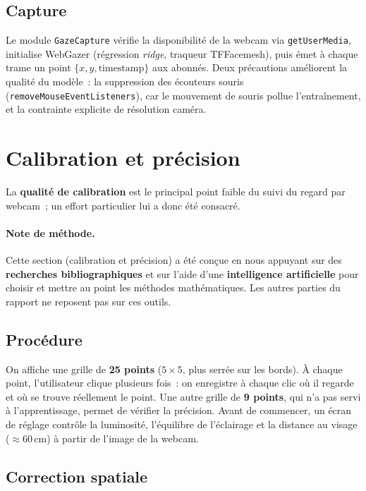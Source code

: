 \documentclass[11pt,a4paper]{article}
\newcommand{\code}[1]{\texttt{\small #1}}
\begin{document}
\subsection{Capture}

Le module \code{GazeCapture} vérifie la disponibilité de la webcam via
\code{getUserMedia}, initialise WebGazer (régression \emph{ridge}, traqueur
TFFacemesh), puis émet à chaque trame un point $\{x, y, \text{timestamp}\}$ aux
abonnés. Deux précautions améliorent la qualité du modèle~: la suppression des
écouteurs souris (\code{removeMouseEventListeners}), car le mouvement de souris
pollue l'entraînement, et la contrainte explicite de résolution caméra.

\section{Calibration et précision}

La \textbf{qualité de calibration} est le principal point faible du suivi du regard par
webcam~; un effort particulier lui a donc été consacré.

\paragraph{Note de méthode.} Cette section (calibration et précision) a été conçue en
nous appuyant sur des \textbf{recherches bibliographiques} et sur l'aide d'une
\textbf{intelligence artificielle} pour choisir et mettre au point les méthodes
mathématiques. Les autres parties du rapport ne reposent pas sur ces outils.

\subsection{Procédure}

On affiche une grille de \textbf{25 points} ($5\times5$, plus serrée sur les bords).
À chaque point, l'utilisateur clique plusieurs fois~: on enregistre à chaque clic où
il regarde et où se trouve réellement le point. Une autre grille de \textbf{9 points},
qui n'a pas servi à l'apprentissage, permet de vérifier la précision. Avant de
commencer, un écran de réglage contrôle la luminosité, l'équilibre de l'éclairage et la
distance au visage ($\approx$60\,cm) à partir de l'image de la webcam.

\subsection{Correction spatiale}
\end{document}
